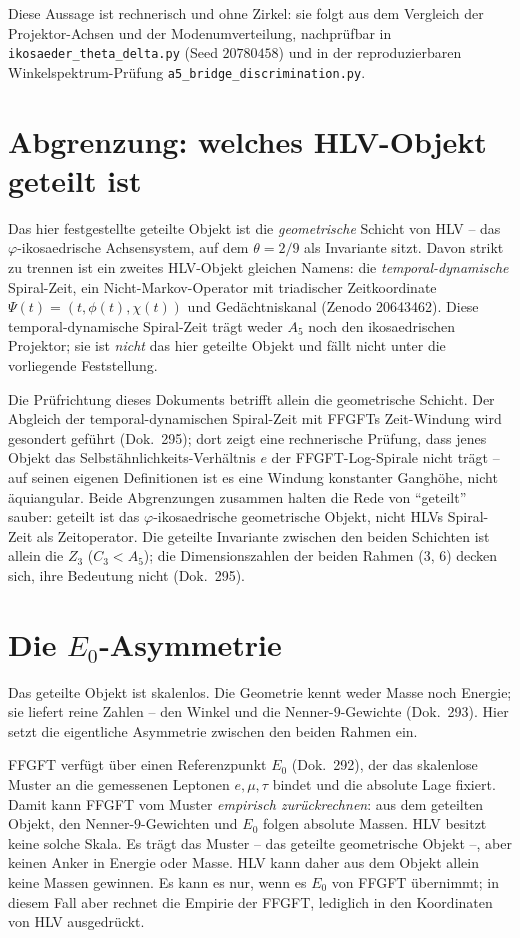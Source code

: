 Diese Aussage ist rechnerisch und ohne Zirkel: sie folgt aus dem Vergleich der Projektor-Achsen
und der Modenumverteilung, nachprüfbar in \texttt{ikosaeder\_theta\_delta.py} (Seed
$20780458$) und in der reproduzierbaren Winkelspektrum-Prüfung \texttt{a5\_bridge\_discrimination.py}.

\section{Abgrenzung: welches HLV-Objekt geteilt ist}
Das hier festgestellte geteilte Objekt ist die \emph{geometrische} Schicht von HLV -- das
$\varphi$-ikosaedrische Achsensystem, auf dem $\theta=2/9$ als Invariante sitzt. Davon strikt zu
trennen ist ein zweites HLV-Objekt gleichen Namens: die \emph{temporal-dynamische} Spiral-Zeit, ein
Nicht-Markov-Operator mit triadischer Zeitkoordinate $\Psi(t)=(t,\phi(t),\chi(t))$ und
Gedächtniskanal (Zenodo 20643462). Diese temporal-dynamische Spiral-Zeit trägt weder $A_5$ noch den
ikosaedrischen Projektor; sie ist \emph{nicht} das hier geteilte Objekt und fällt nicht unter die
vorliegende Feststellung.

Die Prüfrichtung dieses Dokuments betrifft allein die geometrische Schicht. Der Abgleich der
temporal-dynamischen Spiral-Zeit mit FFGFTs Zeit-Windung wird gesondert geführt (Dok.~295); dort
zeigt eine rechnerische Prüfung, dass jenes Objekt das Selbstähnlichkeits-Verhältnis $e$ der
FFGFT-Log-Spirale nicht trägt -- auf seinen eigenen Definitionen ist es eine Windung konstanter
Ganghöhe, nicht äquiangular. Beide Abgrenzungen zusammen halten die Rede von \enquote{geteilt}
sauber: geteilt ist das $\varphi$-ikosaedrische geometrische Objekt, nicht HLVs Spiral-Zeit als
Zeitoperator. Die geteilte Invariante zwischen den beiden Schichten ist allein die $Z_3$
($C_3<A_5$); die Dimensionszahlen der beiden Rahmen ($3$, $6$) decken sich, ihre Bedeutung nicht
(Dok.~295).

\section{Die $E_0$-Asymmetrie}
Das geteilte Objekt ist skalenlos. Die Geometrie kennt weder Masse noch Energie; sie liefert
reine Zahlen -- den Winkel und die Nenner-$9$-Gewichte (Dok.~293). Hier setzt die eigentliche
Asymmetrie zwischen den beiden Rahmen ein.

FFGFT verfügt über einen Referenzpunkt $E_0$ (Dok.~292), der das skalenlose Muster an die
gemessenen Leptonen $e,\mu,\tau$ bindet und die absolute Lage fixiert. Damit kann FFGFT vom
Muster \emph{empirisch zurückrechnen}: aus dem geteilten Objekt, den Nenner-$9$-Gewichten und
$E_0$ folgen absolute Massen. HLV besitzt keine solche Skala. Es trägt das Muster -- das
geteilte geometrische Objekt --, aber keinen Anker in Energie oder Masse. HLV kann daher aus
dem Objekt allein keine Massen gewinnen. Es kann es nur, wenn es $E_0$ von FFGFT übernimmt; in
diesem Fall aber rechnet die Empirie der FFGFT, lediglich in den Koordinaten von HLV
ausgedrückt.

